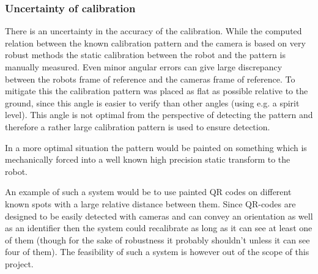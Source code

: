 \subsubsection{Uncertainty of calibration}
There is an uncertainty in the accuracy of the calibration. While the computed relation between the known calibration pattern and the camera is based on very robust methods the static calibration between the robot and the pattern is manually measured. Even minor angular errors can give large discrepancy between the robots frame of reference and the cameras frame of reference. To mitigate this the calibration pattern was placed as flat as possible relative to the ground, since this angle is easier to verify than other angles (using e.g. a spirit level). This angle is not optimal from the perspective of detecting the pattern and therefore a rather large calibration pattern is used to ensure detection.

In a more optimal situation the pattern would be painted on something which is mechanically forced into a well known high precision static transform to the robot.

An example of such a system would be to use painted QR codes on different known spots with a large relative distance between them. Since QR-codes are designed to be easily detected with cameras and can convey an orientation as well as an identifier then the system could recalibrate as long as it can see at least one of them (though for the sake of robustness it probably shouldn’t unless it can see four of them). The feasibility of such a system is however out of the scope of this project.
